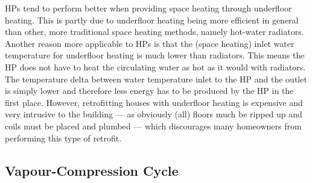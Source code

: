 \acp{HP} tend to perform better when providing space heating through underfloor heating. This is partly due to underfloor heating being more efficient in general than other, more traditional space heating methods, namely hot-water radiators. Another reason more applicable to \acp{HP} is that the (space heating) inlet water temperature for underfloor heating is much lower than radiators. This means the \ac{HP} does not have to heat the circulating water as hot as it would with radiators. The temperature delta between water temperature inlet to the \ac{HP} and the outlet is simply lower and therefore less energy has to be produced by the \ac{HP} in the first place. However, retrofitting houses with underfloor heating is expensive and very intrusive to the building --- as obviously (all) floors much be ripped up and coils must be placed and plumbed --- which discourages many homeowners from performing this type of retrofit.

\subsection{Vapour-Compression Cycle}\label{subsec:vapourcompcycle}


